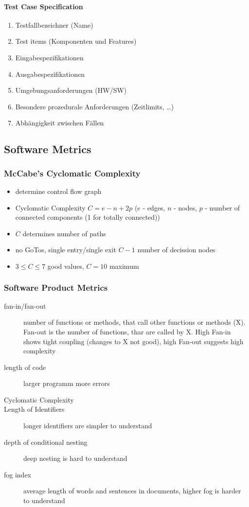 \documentclass[a4paper, 10pt]{article}
\begin{document}
\paragraph{Test Case Specification}
\begin{enumerate}
	\item Testfallbezeichner (Name)
	\item Test items (Komponenten und Features)
	\item Eingabespezifikationen
	\item Ausgabespezifikationen
	\item Umgebungsanforderungen (HW/SW)
	\item Besondere prozedurale Anforderungen (Zeitlimits, \dots)
	\item Abhängigkeit zwischen Fällen
\end{enumerate}

\subsection{Software Metrics}
\subsubsection{McCabe's Cyclomatic Complexity}
\begin{itemize}
	\item determine control flow graph
	\item Cyclomatic Complexity $C=e-n+2p$ ($e$ - edges, $n$ - nodes, $p$ - number of connected components (1 for totally connected)) \\
	\item $C$ determines number of paths
	\item no GoTos, single entry/single exit \follows $C-1$ number of decission nodes
	\item $3\leq C\leq 7$ \follows good values, $C=10$ \follows maximum
\end{itemize}

\subsubsection{Software Product Metrics}
\begin{description}
	\item[fan-in/fan-out] number of functions or methods, that call other functions or methods (X). Fan-out is the number of functions, thar are called by X. High Fan-in shows tight coupling (changes to X not good), high Fan-out suggests high complexity
	\item[length of code] larger programm \follows more errors
	\item[Cyclomatic Complexity]
	\item[Length of Identifiers] longer identifiers are simpler to understand
	\item[depth of conditional nesting] deep nesting is hard to understand
	\item[fog index] average length of words and sentences in documents, higher fog is harder to understand
 \end{description}
\end{document}
